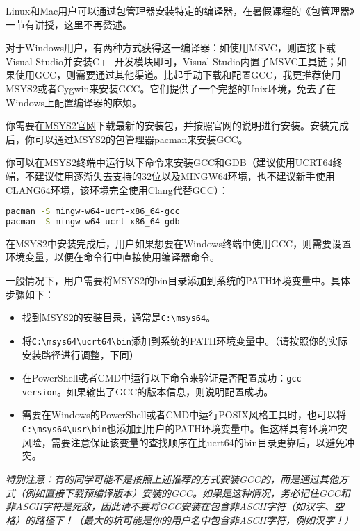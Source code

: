\documentclass[../main.tex]{subfiles}
\begin{document}
Linux和Mac用户可以通过包管理器安装特定的编译器，在暑假课程的《包管理器》一节有讲授，这里不再赘述。

对于Windows用户，有两种方式获得这一编译器：如使用MSVC，则直接下载Visual Studio并安装C++开发模块即可，Visual Studio内置了MSVC工具链；如果使用GCC，则需要通过其他渠道。比起手动下载和配置GCC，我更推荐使用MSYS2或者Cygwin来安装GCC。它们提供了一个完整的Unix环境，免去了在Windows上配置编译器的麻烦。

你需要在\href{https://www.msys2.org/}{MSYS2官网}下载最新的安装包，并按照官网的说明进行安装。安装完成后，你可以通过MSYS2的包管理器pacman来安装GCC。

你可以在MSYS2终端中运行以下命令来安装GCC和GDB（建议使用UCRT64终端，不建议使用逐渐失去支持的32位以及MINGW64环境，也不建议新手使用CLANG64环境，该环境完全使用Clang代替GCC）：

\begin{lstlisting}[language=bash]
pacman -S mingw-w64-ucrt-x86_64-gcc
pacman -S mingw-w64-ucrt-x86_64-gdb
\end{lstlisting}

在MSYS2中安装完成后，用户如果想要在Windows终端中使用GCC，则需要设置环境变量，以便在命令行中直接使用编译器命令。

一般情况下，用户需要将MSYS2的bin目录添加到系统的PATH环境变量中。具体步骤如下：

\begin{itemize}
  \item 找到MSYS2的安装目录，通常是\texttt{C:\textbackslash msys64}。
  \item 将\texttt{C:\textbackslash msys64\textbackslash ucrt64\textbackslash bin}添加到系统的PATH环境变量中。（请按照你的实际安装路径进行调整，下同）
  \item 在PowerShell或者CMD中运行以下命令来验证是否配置成功：\texttt{gcc --version}。如果输出了GCC的版本信息，则说明配置成功。
  \item 需要在Windows的PowerShell或者CMD中运行POSIX风格工具时，也可以将\texttt{C:\textbackslash msys64\textbackslash usr\textbackslash bin}也添加到用户的PATH环境变量中。但这样具有环境冲突风险，需要注意保证该变量的查找顺序在比ucrt64的bin目录更靠后，以避免冲突。
\end{itemize}

\emph{特别注意：有的同学可能不是按照上述推荐的方式安装GCC的，而是通过其他方式（例如直接下载预编译版本）安装的GCC。如果是这种情况，务必记住GCC和非ASCII字符是死敌，因此请不要将GCC安装在包含非ASCII字符（如汉字、空格）的路径下！（最大的坑可能是你的用户名中包含非ASCII字符，例如汉字！）}
\end{document}
